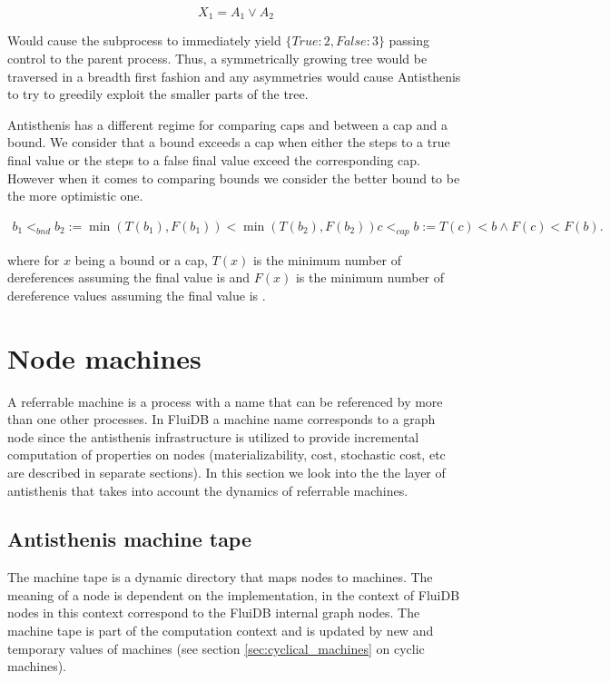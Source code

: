 \[
X_1 = A_1 \lor A_2
\]

Would cause the subprocess to immediately yield
\(\{True: 2, False: 3 \}\) passing control to the parent
process. Thus, a symmetrically growing tree would be traversed in a
breadth first fashion and any asymmetries would cause Antisthenis to
try to greedily exploit the smaller parts of the tree.

Antisthenis has a different regime for comparing caps and between a
cap and a bound. We consider that a bound exceeds a cap when either
the steps to a true final value or the steps to a false final value
exceed the corresponding cap. However when it comes to comparing
bounds we consider the better bound to be the more optimistic one.

\begin{align*}
b_1 <_{bnd} b_2 := \min(T(b_1),F(b_1)) < \min(T(b_2),F(b_2))
c <_{cap} b := T(c) < b \land F(c) < F(b).
\end{align*}

where for \(x\) being a bound or a cap, \(T(x)\) is the minimum number
of dereferences assuming the final value is  and \(F(x)\)
is the minimum number of dereference values assuming the final value
is .




\section{Node machines}

A referrable machine is a process with a name that can be referenced
by more than one other processes. In FluiDB a machine name corresponds
to a graph node since the antisthenis infrastructure is utilized to
provide incremental computation of properties on nodes
(materializability, cost, stochastic cost, etc are described in
separate sections). In this section we look into the the layer of
antisthenis that takes into account the dynamics of referrable
machines.

\subsection{Antisthenis machine tape}

The machine tape is a dynamic directory that maps nodes to
machines. The meaning of a node is dependent on the implementation, in
the context of FluiDB nodes in this context correspond to the FluiDB
internal graph nodes. The machine tape is part of the computation
context and is updated by new and temporary values of machines (see
section \ref{sec:cyclical_machines} on cyclic machines).

